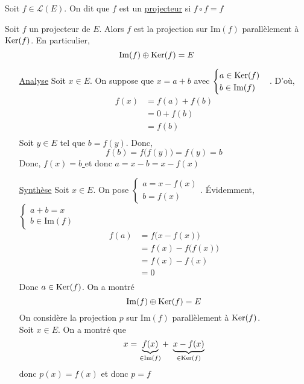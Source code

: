 \begin{defn}
	Soit $f \in \mathcal{L}(E)$. On dit que $f$ est un \underline{projecteur} si $f \circ f = f$
\end{defn}

\begin{prop}
	Soit $f$ un projecteur de $E$. Alors $f$ est la projection sur $\mathrm{Im}(f)$ parallèlement à $\operatorname{Ker}(f)$. En particulier, \[
		\mathrm{Im}(f) \oplus \operatorname{Ker}(f) = E
	\]
\end{prop}

\begin{prv}
	\begin{itemize}
		\item[\underline{\sc Analyse}] Soit $x \in E$. On suppose que $x = a+b$ avec $\begin{cases}
			a \in \operatorname{Ker}(f)\\
			b \in \mathrm{Im}(f)
		\end{cases}$. D'où,
		\begin{align*}
			f(x) &= f(a) + f(b) \\
			&= 0 + f(b) \\
			&= f(b) \\
		\end{align*}
		Soit $y \in E$ tel que $b = f(y)$. Donc, \[
			f(b) = f\big(f(y)\big) = f(y) = b
		\] Donc, \underline{$f(x) = b$ } et donc \underline{$a = x - b = x - f(x)$}\\
	\item[\underline{\sc Synthèse}] Soit $x \in E$. On pose $\begin{cases}
		a = x - f(x)\\
		b = f(x)
	\end{cases}$. Évidemment, $\begin{cases}
		a + b = x\\
		b \in \mathrm{Im}(f)
	\end{cases}$ 
	\begin{align*}
		f(a) &= f\big(x - f(x)\big)\\
		&= f(x) - f\big(f(x)\big) \\
		&= f(x) - f(x) \\
		&= 0 \\
	\end{align*} Donc $a \in \operatorname{Ker}(f)$. On a montré \[
		\mathrm{Im}(f) \oplus \operatorname{Ker}(f) = E
	\] On considère la projection $p$ sur $\mathrm{Im}(f)$ parallèlement à $\operatorname{Ker}(f)$.\\
	Soit $x \in E$. On a montré que \[
		x = \underbrace{f(x)}_{\in \mathrm{Im}(f)} +\ \underbrace{x - f(x)}_{\in \operatorname{Ker}(f)}
	\] donc $p(x) = f(x)$ et donc $p = f$
	\end{itemize}
\end{prv}

